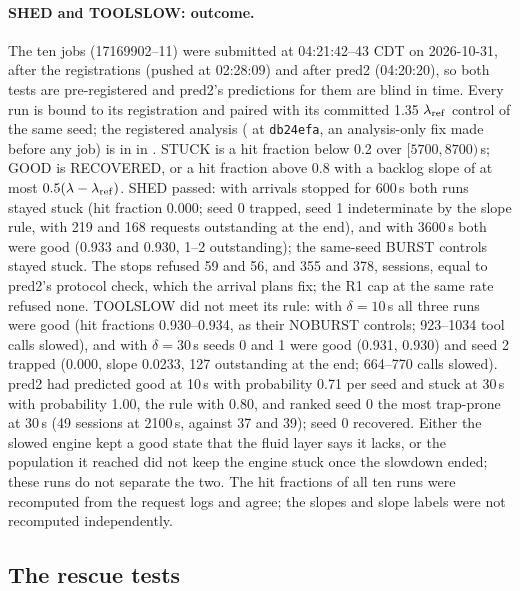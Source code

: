 \paragraph{SHED and TOOLSLOW: outcome.} The ten jobs (17169902--11) were submitted at 04:21:42--43 CDT on 2026-10-31, after the registrations (pushed at 02:28:09) and after pred2 (04:20:20), so both tests are pre-registered and pred2's predictions for them are blind in time. Every run is bound to its registration and paired with its committed 1.35 $\lambda_{\mathrm{ref}}$ control of the same seed; the registered analysis ( at \texttt{db24efa}, an analysis-only fix made before any job) is in  in . STUCK is a hit fraction below 0.2 over $[5700,8700)$\,s; GOOD is RECOVERED, or a hit fraction above 0.8 with a backlog slope of at most $0.5(\lambda-\lambda_{\mathrm{ref}})$. SHED passed: with arrivals stopped for 600\,s both runs stayed stuck (hit fraction 0.000; seed 0 trapped, seed 1 indeterminate by the slope rule, with 219 and 168 requests outstanding at the end), and with 3600\,s both were good (0.933 and 0.930, 1--2 outstanding); the same-seed BURST controls stayed stuck. The stops refused 59 and 56, and 355 and 378, sessions, equal to pred2's protocol check, which the arrival plans fix; the R1 cap at the same rate refused none. TOOLSLOW did not meet its rule: with $\delta=10$\,s all three runs were good (hit fractions 0.930--0.934, as their NOBURST controls; 923--1034 tool calls slowed), and with $\delta=30$\,s seeds 0 and 1 were good (0.931, 0.930) and seed 2 trapped (0.000, slope 0.0233\sps, 127 outstanding at the end; 664--770 calls slowed). pred2 had predicted good at 10\,s with probability 0.71 per seed and stuck at 30\,s with probability 1.00, the rule with 0.80, and ranked seed 0 the most trap-prone at 30\,s (49 sessions at 2100\,s, against 37 and 39); seed 0 recovered. Either the slowed engine kept a good state that the fluid layer says it lacks, or the population it reached did not keep the engine stuck once the slowdown ended; these runs do not separate the two. The hit fractions of all ten runs were recomputed from the request logs and agree; the slopes and slope labels were not recomputed independently.

\subsection{The rescue tests}\label{app:rescuetests}\label{sec:rescue}

